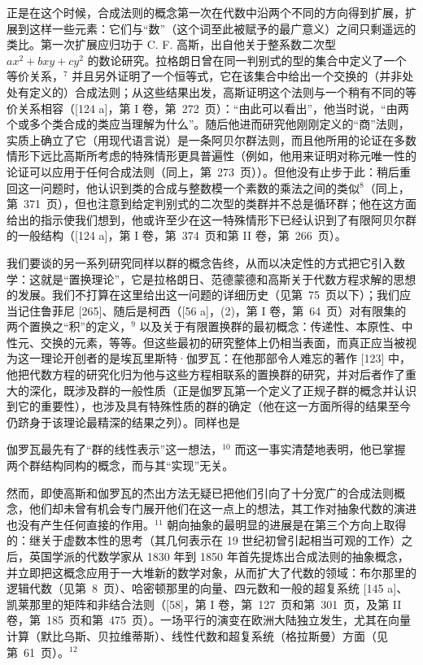 正是在这个时候，合成法则的概念第一次在代数中沿两个不同的方向得到扩展，扩展到这样一些元素：它们与“数”（这个词至此被赋予的最广意义）之间只剩遥远的类比。第一次扩展应归功于 C. F. 高斯，出自他关于整系数二次型 \(ax^{2} + bxy + cy^{2}\) 的数论研究。拉格朗日曾在同一判别式的型的集合中定义了一个等价关系，\(^{7}\) 并且另外证明了一个恒等式，它在该集合中给出一个交换的（并非处处有定义的）合成法则；从这些结果出发，高斯证明这个法则与一个稍有不同的等价关系相容（{[}124 a{]}，第 I 卷，第~272~页）：“由此可以看出”，他当时说，“由两个或多个类合成的类应当理解为什么”。随后他进而研究他刚刚定义的“商”法则，实质上确立了它（用现代语言说）是一条阿贝尔群法则，而且他所用的论证在多数情形下远比高斯所考虑的特殊情形更具普遍性（例如，他用来证明对称元唯一性的论证可以应用于任何合成法则（同上，第~273~页））。但他没有止步于此：稍后重回这一问题时，他认识到类的合成与整数模一个素数的乘法之间的类似\(^{8}\)（同上，第~371~页），但也注意到给定判别式的二次型的类群并不总是循环群；他在这方面给出的指示使我们想到，他或许至少在这一特殊情形下已经认识到了有限阿贝尔群的一般结构（{[}124 a{]}，第 I 卷，第~374~页和第 II 卷，第~266~页）。

我们要谈的另一系列研究同样以群的概念告终，从而以决定性的方式把它引入数学：这就是“置换理论”，它是拉格朗日、范德蒙德和高斯关于代数方程求解的思想的发展。我们不打算在这里给出这一问题的详细历史（见第~75~页以下）；我们应当记住鲁菲尼 {[}265{]}、随后是柯西（{[}56 a{]}，(2)，第 I 卷，第~64~页）对有限集的两个置换之“积”的定义，\(^{9}\) 以及关于有限置换群的最初概念：传递性、本原性、中性元、交换的元素，等等。但这些最初的研究整体上仍相当表面，而真正应当被视为这一理论开创者的是埃瓦里斯特·伽罗瓦：在他那部令人难忘的著作 {[}123{]} 中，他把代数方程的研究化归为他与这些方程相联系的置换群的研究，并对后者作了重大的深化，既涉及群的一般性质（正是伽罗瓦第一个定义了正规子群的概念并认识到它的重要性），也涉及具有特殊性质的群的确定（他在这一方面所得的结果至今仍跻身于该理论最精深的结果之列）。同样也是

伽罗瓦最先有了“群的线性表示”这一想法，\(^{10}\) 而这一事实清楚地表明，他已掌握两个群结构同构的概念，而与其“实现”无关。

然而，即使高斯和伽罗瓦的杰出方法无疑已把他们引向了十分宽广的合成法则概念，他们却未曾有机会专门展开他们在这一点上的想法，其工作对抽象代数的演进也没有产生任何直接的作用。\(^{11}\) 朝向抽象的最明显的进展是在第三个方向上取得的：继关于虚数本性的思考（其几何表示在 19 世纪初曾引起相当可观的工作）之后，英国学派的代数学家从 1830 年到 1850 年首先提炼出合成法则的抽象概念，并立即把这概念应用于一大堆新的数学对象，从而扩大了代数的领域：布尔那里的逻辑代数（见第~8~页）、哈密顿那里的向量、四元数和一般的超复系统 {[}145 a{]}、凯莱那里的矩阵和非结合法则（{[}58{]}，第 I 卷，第~127~页和第~301~页，及第 II 卷，第~185~页和第~475~页）。一场平行的演变在欧洲大陆独立发生，尤其在向量计算（默比乌斯、贝拉维蒂斯）、线性代数和超复系统（格拉斯曼）方面（见第~61~页）。\(^{12}\)

